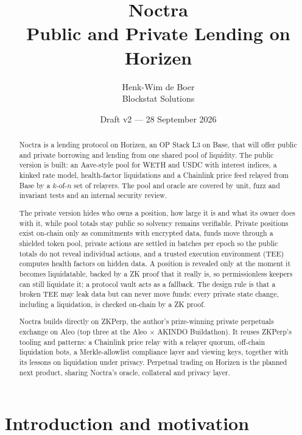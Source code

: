 \documentclass[11pt,a4paper]{article}
\title{\textbf{Noctra}\\[4pt]\large Public and Private Lending on Horizen}
\author{Henk-Wim de Boer\\Blockstat Solutions}
\date{Draft v2 --- 28 September 2026}
\begin{document}
\maketitle

\begin{abstract}
\noindent Noctra is a lending protocol on Horizen, an OP Stack L3 on Base, that will offer public and private
borrowing and lending from one shared pool of liquidity. The public version is built: an Aave-style pool for
WETH and USDC with interest indices, a kinked rate model, health-factor liquidations and a Chainlink price feed
relayed from Base by a $k$-of-$n$ set of relayers. The pool and oracle are covered by unit, fuzz and invariant
tests and an internal security review.

The private version hides who owns a position, how large it is and what its owner does with it, while pool
totals stay public so solvency remains verifiable. Private positions exist on-chain only as commitments with
encrypted data, funds move through a shielded token pool, private actions are settled in batches per epoch so
the public totals do not reveal individual actions, and a trusted execution environment (TEE) computes health
factors on hidden data. A position is revealed only at the moment it becomes liquidatable, backed by a ZK proof
that it really is, so permissionless keepers can still liquidate it; a protocol vault acts as a fallback. The
design rule is that a broken TEE may leak data but can never move funds: every private state change, including
a liquidation, is checked on-chain by a ZK proof.

Noctra builds directly on ZKPerp, the author's prize-winning private perpetuals exchange on Aleo (top three at
the Aleo $\times$ AKINDO Buildathon). It reuses ZKPerp's tooling and patterns: a Chainlink price relay with a
relayer quorum, off-chain liquidation bots, a Merkle-allowlist compliance layer and viewing keys, together with
its lessons on liquidation under privacy. Perpetual trading on Horizen is the planned next product,
sharing Noctra's oracle, collateral and privacy layer.
\end{abstract}

\tableofcontents
\newpage

\section{Introduction and motivation}
\end{document}
